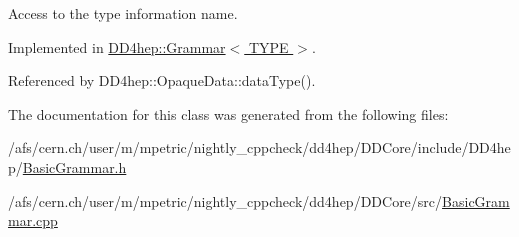 Access to the type information name. 



Implemented in \hyperlink{class_d_d4hep_1_1_grammar_a26bd74714c2c52cd9102bea266607c75}{D\+D4hep\+::\+Grammar$<$ T\+Y\+P\+E $>$}.



Referenced by D\+D4hep\+::\+Opaque\+Data\+::data\+Type().



The documentation for this class was generated from the following files\+:\begin{DoxyCompactItemize}
\item 
/afs/cern.\+ch/user/m/mpetric/nightly\+\_\+cppcheck/dd4hep/\+D\+D\+Core/include/\+D\+D4hep/\hyperlink{_basic_grammar_8h}{Basic\+Grammar.\+h}\item 
/afs/cern.\+ch/user/m/mpetric/nightly\+\_\+cppcheck/dd4hep/\+D\+D\+Core/src/\hyperlink{_basic_grammar_8cpp}{Basic\+Grammar.\+cpp}\end{DoxyCompactItemize}
